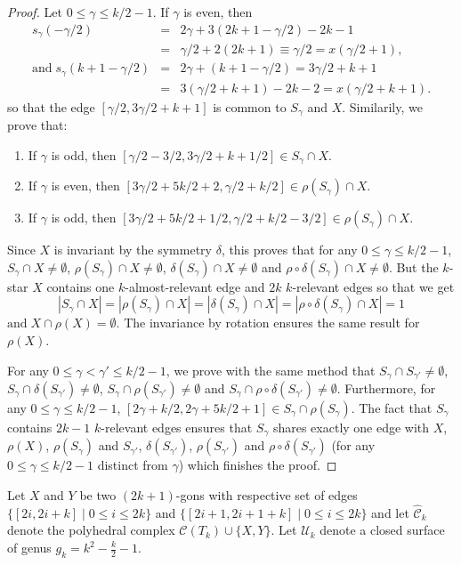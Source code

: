 \documentclass[12pt]{amsart}
\begin{document}
\begin{proof}
Let $0\le\gamma\le k/2-1$.
If $\gamma$ is even, then
\begin{eqnarray*}
s_{\gamma}(-\gamma/2)&=&2\gamma+3(2k+1-\gamma/2)-2k-1\\
&=&\gamma/2+2(2k+1)\equiv \gamma/2=x(\gamma/2+1),\\
\mathrm{and}\;s_{\gamma}(k+1-\gamma/2)&=&2\gamma+(k+1-\gamma/2)=3\gamma/2+k+1\\
&=&3(\gamma/2+k+1)-2k-2=x(\gamma/2+k+1).
\end{eqnarray*}
so that the edge $[\gamma/2,3\gamma/2+k+1]$ is common to $S_\gamma$ and $X$.
Similarily, we prove that:
\begin{enumerate}
\item If $\gamma$ is odd, then $[\gamma/2-3/2,3\gamma/2+k+1/2]\in S_\gamma\cap X$.
\item If $\gamma$ is even, then $[3\gamma/2+5k/2+2,\gamma/2+k/2]\in\rho(S_\gamma)\cap X$.
\item If $\gamma$ is odd, then $[3\gamma/2+5k/2+1/2,\gamma/2+k/2-3/2]\in\rho(S_\gamma)\cap X$.
\end{enumerate}
Since $X$ is invariant by the symmetry $\delta$, this proves that for any $0\le\gamma\le k/2-1$,
$S_\gamma\cap X\ne\emptyset$, $\rho(S_\gamma)\cap X\ne\emptyset$, $\delta(S_\gamma)\cap X\ne\emptyset$ and $\rho\circ\delta(S_\gamma)\cap X\ne\emptyset$.
But the $k$-star $X$ contains one $k$-almost-relevant edge and $2k$ $k$-relevant edges so that we get
$$|S_\gamma\cap X|=|\rho(S_\gamma)\cap X|=|\delta(S_\gamma)\cap X|=|\rho\circ\delta(S_\gamma)\cap X|=1$$
$\mathrm{and}\; X\cap\rho(X)=\emptyset$. The invariance by rotation ensures the same result for $\rho(X)$.

For any $0\le\gamma<\gamma'\le k/2-1$, we prove with the same method that $S_\gamma\cap S_{\gamma'}\ne\emptyset$, $S_\gamma\cap \delta(S_{\gamma'})\ne\emptyset$, $S_\gamma\cap \rho(S_{\gamma'})\ne\emptyset$ and $S_\gamma\cap \rho\circ\delta(S_{\gamma'})\ne\emptyset$.
Furthermore, for any $0\le\gamma\le k/2-1$, $[2\gamma+k/2,2\gamma+5k/2+1]\in S_\gamma\cap \rho(S_{\gamma})$. The fact that $S_\gamma$ contains $2k-1$ $k$-relevant edges ensures that $S_\gamma$ shares exactly one edge with $X$, $\rho(X)$, $\rho(S_\gamma)$ and $S_{\gamma'}$, $\delta(S_{\gamma'})$, $\rho(S_{\gamma'})$ and $\rho\circ\delta(S_{\gamma'})$ (for any $0\le\gamma\le k/2-1$ distinct from $\gamma$) which finishes the proof.
\end{proof}

Let $X$ and $Y$ be two $(2k+1)$-gons with respective set of edges $\{[2i,2i+k]\;|\; 0\le i\le 2k\}$ and $\{[2i+1,2i+1+k]\;|\; 0\le i\le 2k\}$ and let $\hat{\mathcal{C}}_k$ denote the polyhedral complex $\mathcal{C}(T_k)\cup\{X,Y\}$.
Let $\mathcal{U}_k$ denote a closed surface of genus $g_k=k^2-\frac{k}{2}-1$.
\end{document}
